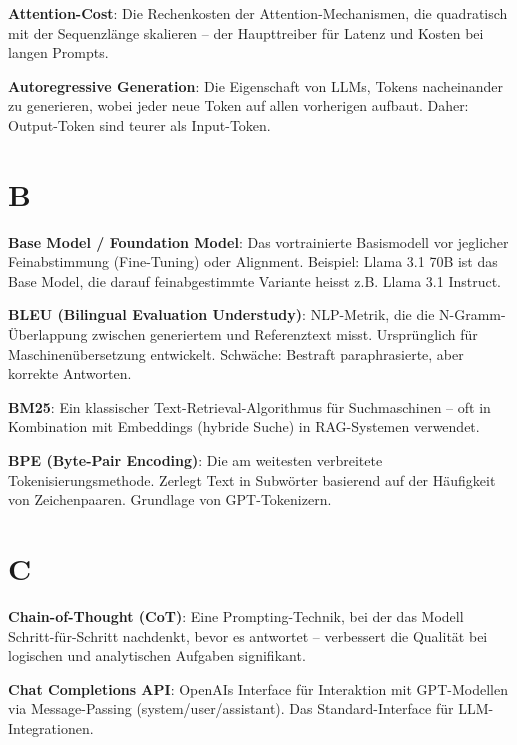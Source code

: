 \textbf{Attention-Cost}\hspace{0pt}: Die Rechenkosten der Attention-Mechanismen, die quadratisch mit der Sequenzlänge skalieren -- der Haupttreiber für Latenz und Kosten bei langen Prompts.

\textbf{Autoregressive Generation}\hspace{0pt}: Die Eigenschaft von LLMs, Tokens nacheinander zu generieren, wobei jeder neue Token auf allen vorherigen aufbaut. Daher: Output-Token sind teurer als Input-Token.

\section{B}

\textbf{Base Model / Foundation Model}\hspace{0pt}: Das vortrainierte Basismodell vor jeglicher Feinabstimmung (Fine-Tuning) oder Alignment. Beispiel: Llama 3.1 70B ist das Base Model, die darauf feinabgestimmte Variante heisst z.B. Llama 3.1 Instruct.

\textbf{BLEU (Bilingual Evaluation Understudy)}\hspace{0pt}: NLP-Metrik, die die N-Gramm-Überlappung zwischen generiertem und Referenztext misst. Ursprünglich für Maschinenübersetzung entwickelt. Schwäche: Bestraft paraphrasierte, aber korrekte Antworten.

\textbf{BM25}\hspace{0pt}: Ein klassischer Text-Retrieval-Algorithmus für Suchmaschinen -- oft in Kombination mit Embeddings (hybride Suche) in RAG-Systemen verwendet.

\textbf{BPE (Byte-Pair Encoding)}\hspace{0pt}: Die am weitesten verbreitete Tokenisierungsmethode. Zerlegt Text in Subwörter basierend auf der Häufigkeit von Zeichenpaaren. Grundlage von GPT-Tokenizern.

\section{C}

\textbf{Chain-of-Thought (CoT)}\hspace{0pt}: Eine Prompting-Technik, bei der das Modell Schritt-für-Schritt nachdenkt, bevor es antwortet -- verbessert die Qualität bei logischen und analytischen Aufgaben signifikant.

\textbf{Chat Completions API}\hspace{0pt}: OpenAIs Interface für Interaktion mit GPT-Modellen via Message-Passing (system/user/assistant). Das Standard-Interface für LLM-Integrationen.

